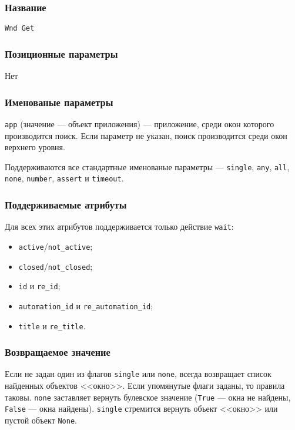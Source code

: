 \documentclass[11pt]{book} %
\begin{document}
\subsubsection*{Название}
\verb"Wnd Get"

\subsubsection*{Позиционные параметры}

Нет

\subsubsection*{Именованые параметры} 
\verb"app" (значение --- объект приложения) --- приложение, среди окон которого производится поиск. Если параметр не указан, поиск производится среди окон верхнего уровня.

Поддерживаются все стандартные именованые параметры --- \verb"single", \verb|any|, \verb|all|, \verb|none|, \verb|number|, \verb"assert" и \verb"timeout".


\subsubsection*{Поддерживаемые атрибуты} 

Для всех этих атрибутов поддерживается только действие \verb|wait|:

\begin{itemize}
\item \verb"active"/\verb"not_active";
\item \verb"closed"/\verb"not_closed";
\item \verb"id" и \verb"re_id";
\item \verb"automation_id" и \verb"re_automation_id";
\item \verb"title" и \verb"re_title".
\end{itemize}

\subsubsection*{Возвращаемое значение}
Если не задан один из флагов \verb"single" или \verb"none", всегда возвращает список найденных объектов <<окно>>. Если упомянутые флаги заданы, то правила таковы. \verb"none" заставляет вернуть булевское значение (\verb"True" --- окна не найдены, \verb"False" --- окна найдены). \verb"single" стремится вернуть объект <<окно>> или пустой объект \verb"None".
\end{document}
